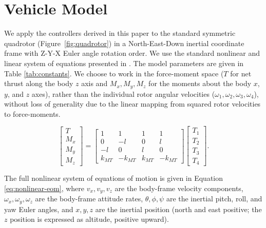 \documentclass[conf]{new-aiaa}
\begin{document}
\section{Vehicle Model}
We apply the controllers derived in this paper to the standard symmetric quadrotor (Figure~\ref{fig:quadrotor}) in a North-East-Down inertial coordinate frame with Z-Y-X Euler angle rotation order. We use the standard nonlinear and linear system of equations presented in \cite{refs:Tahir2020}. The model parameters are given in Table \ref{tab:constants}. We choose to work in the force-moment space ($T$ for net thrust along the body $z$ axis and $M_x, M_y, M_z$ for the moments about the body $x$, $y$, and $z$ axes), rather than the individual rotor angular velocities ($\omega_1, \omega_2, \omega_3, \omega_4$), without loss of generality due to the linear mapping from squared rotor velocities to force-moments.

\begin{equation}
\label{eq:thrusts}
\begin{bmatrix}
T \\ M_x \\ M_y \\ M_z
\end{bmatrix}
=
\begin{bmatrix}
1 & 1 & 1 & 1 \\
0 & -l & 0 & l \\
-l & 0 & l & 0 \\
k_{MT} & -k_{MT} & k_{MT} & -k_{MT}
\end{bmatrix}
\begin{bmatrix}
T_1 \\ T_2 \\ T_3 \\ T_4
\end{bmatrix}.
\end{equation}

The full nonlinear system of equations of motion is given in Equation \ref{eq:nonlinear-eom}, where $v_x, v_y, v_z$ are the body-frame velocity components, $\omega_x, \omega_y, \omega_z$ are the body-frame attitude rates, $\theta, \phi, \psi$ are the inertial pitch, roll, and yaw Euler angles, and $x, y, z$ are the inertial position (north and east positive; the $z$ position is expressed as altitude, positive upward).
\end{document}
